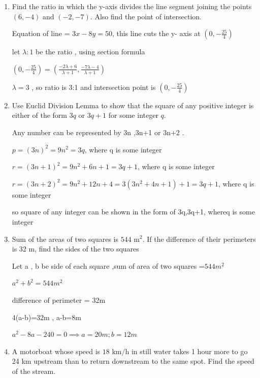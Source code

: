 \begin{enumerate}[label=\thesubsection.\arabic*, ref=\thesubsection.\theenumi]
	\begin{align}
		4x-y=8 
	\end{align}
	so, $$x=5 , y=12$$
	\item  Find the ratio in which the y-axis divides the line segment joining the points $(6, -4)$ and $(-2, -7)$. Also find the point of intersection. 
	
	\solution
	
	Equation of line = $3x-8y=50$, this line cuts the y- axis at $(0,-\frac{25}{4})$
	
	let $\lambda :1 $ be the ratio , using section formula 
	
	$(0,-\frac{25}{4})=\left( \frac{-2\lambda + 6}{\lambda +1} ,\frac{-7\lambda -4}{\lambda +1}\right) $
	
	$\lambda=3 $ , so ratio is 3:1 and intersection point is $(0,-\frac{25}{4})$
	
	\item Use Euclid Division Lemma to show that the square of any positive integer is either of the form $3q$ or $3q+1$ for some integer $q$.
	
	\solution
	
	Any number can be represented by 3n ,3n+1 or 3n+2 .
	
	$p=(3n)^2 = 9n^2 =3q $, where q is some integer 
	
	$r= (3n +1)^2 = 9n^2+6n +1= 3q+1 $, where q is some integer 
	
	$r=(3n+2)^2= 9n^2+ 12n+4= 3(3n^2+4n+1)+1= 3q+1$, where q is some integer 
	
	so square of any integer can be shown in the form of 3q,3q+1, whereq is some integer 
	
	\item  Sum of the areas of two squares is $544\text{ m}^{2}$. If the difference of their perimeters is 32 m, find the sides of the two squares
	
	\solution
	
	Let a , b be side of each square ,sum of area of two squares =$544m^2$
	
	$a^2+b^2 = 544m^2$
	
	difference of perimeter = 32m
	
	4(a-b)=32m , a-b=8m 
	
	$a^2-8a-240 =0 \implies a=20m ;b=12m $
	
	\item 
	
	A motorboat whose speed is $18\text{ km/h}$ in still water takes 1 hour more to go 24 km upstream than to return downstream to the same spot. Find the speed of the stream. 
	

\end{enumerate}

